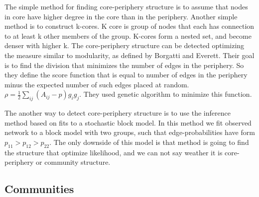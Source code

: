 The simple method for finding core-periphery structure is to assume that nodes in core have higher degree in the core than in the periphery. Another simple method is to construct k-cores. K core is group of nodes that each has connection to at least k other members of the group. K-cores form a nested set, and become denser with higher k. The core-periphery structure can be detected optimizing the measure similar to modularity, as defined by Borgatti and Everett. Their goal is to find the division that minimizes the number of edges in the periphery. So they define the score function that is equal to number of edges in the periphery minus the expected number of such edges placed at random. $\rho = \frac{1}{2}\sum_{ij}(A_{ij}-p)g_ig_j$. They used genetic algorithm to minimize this function. 

The another way to detect core-periphery structure is to use the inference method based on fits to a stochastic block model. In this method we fit observed network to a block model with two groups, such that edge-probabilities have form $p_{11}> p_{12} > p_{22}$. The only downside of this model is that method is going to find the structure that optimize likelihood, and we can not say weather it is core-periphery or community structure. 

\subsection{Communities}

